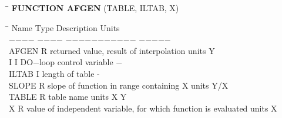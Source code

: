 \bigskip
\nwln
\begin{tabbing}
\hspace{1.27cm}\=\hspace{1.27cm}\=\hspace{1.27cm}\=\hspace{1.27cm}\=%
\hspace{1.27cm}\=\hspace{1.27cm}\=\hspace{1.27cm}\=\hspace{1.27cm}\=%
\hspace{1.27cm}\=\hspace{1.27cm}\=\kill
{\bf FUNCTION AFGEN} \> \> \> (TABLE, ILTAB, X)
\end{tabbing}
\nwln
\begin{tabbing}
\hspace{1.27cm}\=\hspace{1.27cm}\=\hspace{1.27cm}\=\hspace{1.27cm}\=%
\hspace{1.27cm}\=\hspace{1.27cm}\=\hspace{1.27cm}\=\hspace{1.27cm}\=%
\hspace{1.27cm}\=\hspace{1.27cm}\=\kill
Name    \> \> Type   \> Description                                        \> \> \> \> \> \> \> Units\\
$-$$-$$-$$-$    \> \> $-$$-$$-$$-$   \> $-$$-$$-$$-$$-$$-$$-$$-$$-$$-$$-$                                        \> \> \> \> \> \> \> $-$$-$$-$$-$$-$\\
AFGEN   \> \> R   \> returned value, result of interpolation            \> \> \> \> \> \> \> units Y\\
I       \> \> I   \> DO$-$loop control variable                           \> \> \> \> \> \> \> $-$\\
ILTAB\> \> I\> length of table\> \> \> \> \> \> \> -\\
SLOPE   \> \> R   \> slope of function in range containing X            \> \> \> \> \> \> \> units Y/X\\
TABLE   \> \> R   \> table name\> \> \> \> \> \> \> units X Y\\
X       \> \> R   \> value of independent variable, for which function is evaluated\> \> \> \> \> \> \> units X
\end{tabbing}

